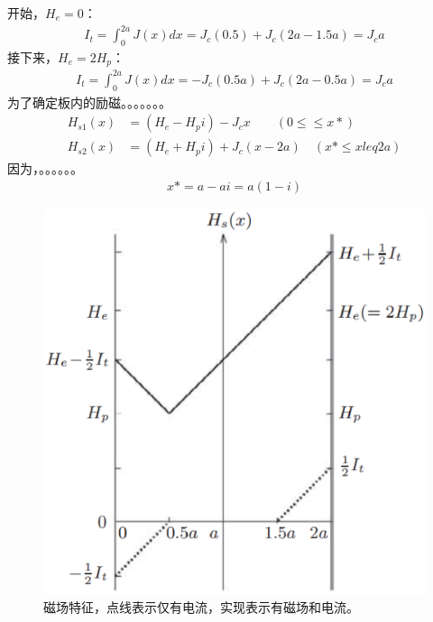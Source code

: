开始，$H_e=0$：
\begin{align*}%
I_{t}=\int_{0}^{2a}J(x)dx=J_{c}(0.5)+J_{c}(2a-1.5a)=J_{c}a
\end{align*}
接下来，$H_e=2H_p$：
\begin{align*}%
I_{t}=\int_{0}^{2a}J(x)dx=-J_{c}(0.5a)+J_{c}(2a-0.5a)=J_{c}a
\end{align*}
为了确定板内的励磁。。。。。。。
\begin{align*}
H_{s1}(x)&=(H_{e}-H_{p}i)-J_{c}x\qquad(0\leq \leq x*)\\
H_{s2}(x)&=(H_{e}+H_{p}i)+J_{c}(x-2a)\quad(x*\leq x leq  2a)
\end{align*}
因为，。。。。。。
\begin{align*}%
x*=a-ai=a(1-i)
\end{align*}

\begin{figure}[htbp]
	\centering
	\includegraphics[scale=0.5]{chpt5/figs/fig5.11.eps}
	\caption{磁场特征，点线表示仅有电流，实现表示有磁场和电流。}
\end{figure}

